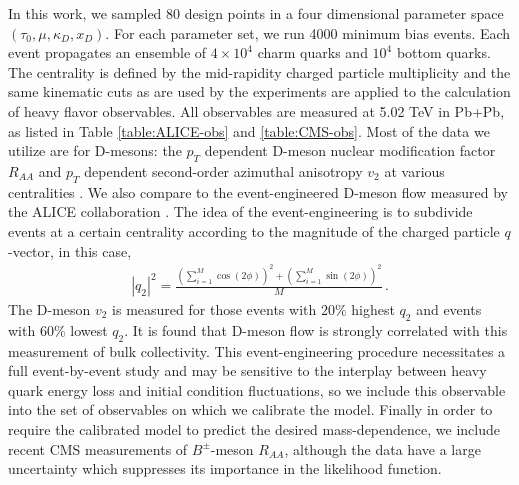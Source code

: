 \documentclass[aps, prc, reprint, amsmath, groupedaddress, nofootinbib]{revtex4-1}
\begin{document}
In this work, we sampled 80 design points in a four dimensional parameter space $(\tau_0, \mu, \kappa_D, x_D)$.
For each parameter set, we run 4000 minimum bias events.
Each event propagates an ensemble of $4\times 10^4$ charm quarks and $10^4$ bottom quarks.
The centrality is defined by the mid-rapidity charged particle multiplicity and the same kinematic cuts as are used by the experiments are applied to the calculation of heavy flavor observables.
All observables are measured at 5.02 TeV in Pb+Pb, as listed in Table \ref{table:ALICE-obs} and \ref{table:CMS-obs}. Most of the data we utilize are for D-mesons: the
 $p_T$ dependent D-meson nuclear modification factor $R_{AA}$ and $p_T$ dependent second-order azimuthal anisotropy $v_2$ at various centralities \cite{Sirunyan:2017plt, Sirunyan:2017xss, Acharya:2017qps,Grosa:2017zcz}.
We also compare to the event-engineered D-meson flow  measured by the  ALICE collaboration \cite{Grosa:2017zcz}.
The idea of the event-engineering is to subdivide events at a certain centrality according to the magnitude of the charged particle $q$-vector, in this case,
\begin{eqnarray}
|q_2|^2 = \frac{\left(\sum_{i=1}^{M} \cos(2\phi) \right)^2+ \left(\sum_{i=1}^{M} \sin(2\phi) \right)^2}{M} \, .
\end{eqnarray}
The D-meson $v_2$ is measured for those events with $20\%$ highest $q_2$ and events with $60\%$ lowest $q_2$.
It is found that D-meson flow is strongly correlated with this measurement of bulk collectivity.
This event-engineering procedure necessitates a full event-by-event study and may be sensitive to the interplay between heavy quark energy loss and initial condition fluctuations, so we include this observable into the set of observables on which we calibrate the model.
Finally in order to require the calibrated model to predict the desired mass-dependence, we include recent CMS measurements of $B^{\pm}$-meson $R_{AA}$, although the data have a large uncertainty which suppresses its importance in the likelihood function.
\end{document}
